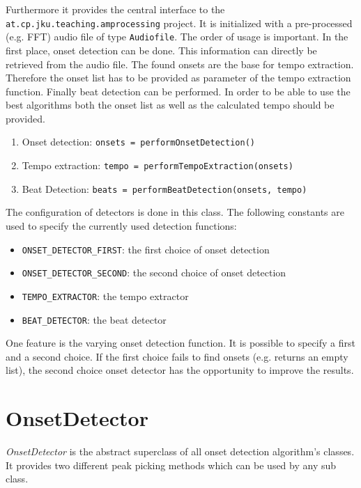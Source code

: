 Furthermore it provides the central interface to the
\texttt{at.cp.jku.teaching.am\-pro\-ces\-sing} project. It is initialized with a
pre-processed (e.g. FFT) audio file of type \texttt{Audiofile}. The order of
usage is important. In the first place, onset detection can be done. This
information can directly be retrieved from the audio file. The found onsets are
the base for tempo extraction. Therefore the onset list has to be provided as
parameter of the tempo extraction function. Finally beat detection can be
performed. In order to be able to use the best algorithms both the onset list as
well as the calculated tempo should be provided.

\begin{enumerate}
  \item Onset detection: \texttt{onsets = performOnsetDetection()}
  \item Tempo extraction: \texttt{tempo = performTempoExtraction(onsets)}
  \item Beat Detection: \texttt{beats = performBeatDetection(onsets, tempo)}
\end{enumerate}

The configuration of detectors is done in this class. The following constants
are used to specify the currently used detection functions:

\begin{itemize}
  \item \texttt{ONSET\_DETECTOR\_FIRST}: the first choice of onset detection
  \item \texttt{ONSET\_DETECTOR\_SECOND}: the second choice of onset detection
  \item \texttt{TEMPO\_EXTRACTOR}: the tempo extractor
  \item \texttt{BEAT\_DETECTOR}: the beat detector
\end{itemize}

One feature is the varying onset detection function. It is possible to specify a
first and a second choice. If the first choice fails to find onsets (e.g.
returns an empty list), the second choice onset detector has the opportunity to
improve the results.

\section{\ttfamily OnsetDetector} \label{sec:onset}
\emph{OnsetDetector} is the abstract superclass of all onset detection
algorithm's classes. It provides two different peak picking methods which can be
used by any sub class.


